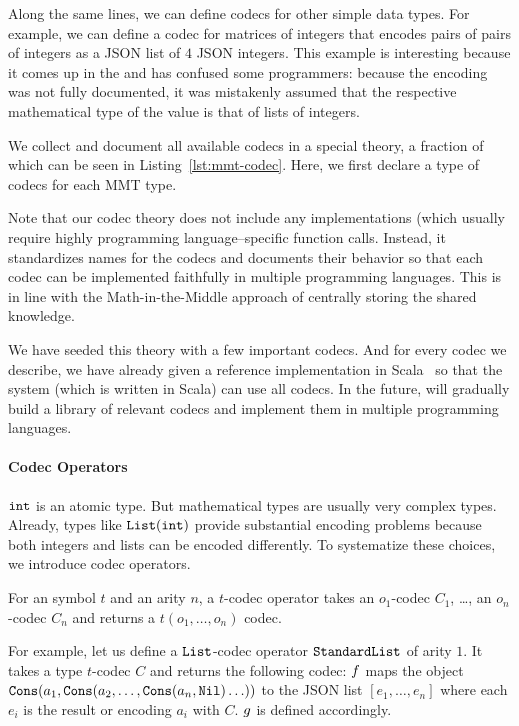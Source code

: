 Along the same lines, we can define codecs for other simple data types.
For example, we can define a codec for matrices of integers that encodes pairs of pairs of integers as a JSON list of $4$ JSON integers.
This example is interesting because it comes up in the \LMFDB and has confused some programmers: because the encoding was not fully documented, it was mistakenly assumed that the respective mathematical type of the value is that of lists of integers.



We collect and document all available codecs in a special \MMT theory, a fraction of which can be seen in Listing~\ref{lst:mmt-codec}.
Here, we first declare a type of codecs for each MMT type.

Note that our codec theory does not include any implementations (which usually require highly programming language--specific function calls.
Instead, it standardizes names for the codecs and documents their behavior so that each codec can be implemented faithfully in multiple programming languages.
This is in line with the Math-in-the-Middle approach of centrally storing the shared knowledge.

We have seeded this theory with a few important codecs.  And for every codec we describe,
we have already given a reference implementation in Scala~\cite{scala:webpage} so that the
\MMT system (which is written in Scala) can use all codecs.  In the future, \pn will
gradually build a library of relevant codecs and implement them in multiple programming
languages.

\paragraph{Codec Operators}
$\Int$ is an atomic type.
But mathematical types are usually very complex types.
Already, types like $\lst(\Int)$ provide substantial encoding problems because both integers and lists can be encoded differently.
To systematize these choices, we introduce codec operators.

\begin{mydef}
  For an \MMT symbol $t$ and an arity $n$, a $t$-codec operator takes an $o_1$-codec $C_1$, \ldots, an $o_n$-codec $C_n$ and returns a $t(o_1,\ldots,o_n)$ codec.
\end{mydef}

For example, let us define a $\lst$-codec operator $\standardList$ of arity $1$.
It takes a type $t$-codec $C$ and returns the following codec: $\enc$ maps the object $\cons(a_1,\cons(a_2,\ldots,\cons(a_n,\nil)\ldots))$ to the JSON list $[e_1,\ldots,e_n]$ where each $e_i$ is the result or encoding $a_i$ with $C$.
$\dec$ is defined accordingly.

